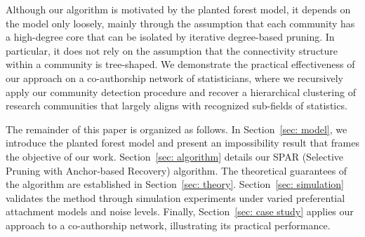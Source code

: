 \documentclass[twoside,11pt]{article}
\theoremstyle{remark}
\begin{document}
Although our algorithm is motivated by the planted forest model, it depends on the model only loosely, mainly through the assumption that each community has a high-degree core that can be isolated by iterative degree-based pruning. In particular, it does not rely on the assumption that the connectivity structure within a community is tree-shaped. We demonstrate the practical effectiveness of our approach on a co-authorship network of statisticians, where we recursively apply our community detection procedure and recover a hierarchical clustering of research communities that largely aligns with recognized sub-fields of statistics.



The remainder of this paper is organized as follows. In Section~\ref{sec: model}, we introduce the planted forest model and present an impossibility result that frames the objective of our work. 
Section~\ref{sec: algorithm} details our SPAR (Selective Pruning with Anchor-based Recovery) algorithm. The theoretical guarantees of the algorithm are established in Section~\ref{sec: theory}. Section~\ref{sec: simulation} validates the method through simulation experiments under varied preferential attachment models and noise levels. 
Finally, Section~\ref{sec: case study} applies our approach to a co-authorship network, illustrating its practical performance.
\end{document}
